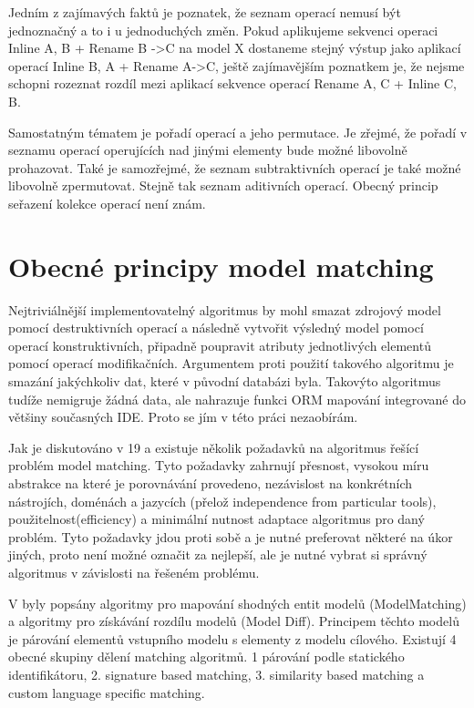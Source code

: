 \documentclass[11pt,twoside,a4paper]{book}
\begin{document}
Jedním z zajímavých faktů je poznatek, že seznam operací nemusí být jednoznačný
a to i u jednoduchých změn. Pokud aplikujeme sekvenci operaci Inline A, B + 
Rename B ->C na model X dostaneme stejný výstup jako aplikací operací Inline B,
A + Rename A->C, ještě zajímavějším poznatkem je, že nejsme schopni rozeznat
rozdíl mezi aplikací sekvence operací Rename A, C + Inline C, B.

Samostatným tématem je pořadí operací a jeho permutace. Je zřejmé, že pořadí v
seznamu operací operujících nad jinými elementy bude možné libovolně prohazovat.
Také je samozřejmé, že seznam subtraktivních operací je také možné libovolně
zpermutovat. Stejně tak seznam aditivních operací. Obecný princip seřazení kolekce 
operací není znám. 

\section{Obecné principy model matching}
Nejtriviálnější implementovatelný algoritmus by mohl smazat zdrojový model
pomocí destruktivních operací a následně vytvořit výsledný model pomocí operací
konstruktivních, připadně poupravit atributy jednotlivých elementů pomocí
operací modifikačních. Argumentem proti použití takového algoritmu je smazání
jakýchkoliv dat, které v původní databázi byla. Takovýto algoritmus tudíže
nemigruje žádná data, ale nahrazuje funkci ORM mapování integrované
do většiny současných IDE. Proto se jím v této práci nezaobírám.

Jak je diskutováno v 19 a \cite{Kolovos:Different_models} existuje několik
požadavků na algoritmus řešící problém model matching. Tyto požadavky zahrnují
přesnost, vysokou míru abstrakce na které je porovnávání provedeno, nezávislost
na konkrétních nástrojích, doménách a jazycích (přelož independence from
particular tools), použitelnost(efficiency) a minimální nutnost adaptace
algoritmus pro daný problém. Tyto požadavky jdou proti sobě a je nutné
preferovat některé na úkor jiných, proto není možné označit za nejlepší, ale je
nutné vybrat si správný algoritmus v závislosti na řešeném problému.

 V \cite{Kolovos:Different_models} byly popsány algoritmy
pro mapování shodných entit modelů (ModelMatching) a algoritmy pro získávání
rozdílu modelů (Model Diff). 
 Principem těchto modelů je párování elementů vstupního modelu s elementy z
 modelu cílového. Existují 4 obecné skupiny dělení matching algoritmů. 1
 párování podle statického identifikátoru, 2. signature based matching, 3.
 similarity based matching a custom language specific matching.
 
\end{document}
